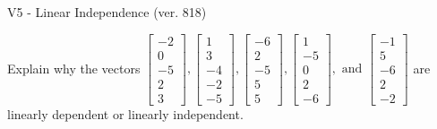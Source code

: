 \begin{exercise}
  \begin{exerciseTitle}V5 - Linear Independence (ver. 818)\end{exerciseTitle}
  \begin{exerciseStatement}
    Explain why the vectors \(\left[\begin{array}{r}
-2 \\
0 \\
-5 \\
2 \\
3
\end{array}\right] , \left[\begin{array}{r}
1 \\
3 \\
-4 \\
-2 \\
-5
\end{array}\right] , \left[\begin{array}{r}
-6 \\
2 \\
-5 \\
5 \\
5
\end{array}\right] , \left[\begin{array}{r}
1 \\
-5 \\
0 \\
2 \\
-6
\end{array}\right] , \text{ and } \left[\begin{array}{r}
-1 \\
5 \\
-6 \\
2 \\
-2
\end{array}\right]\) are linearly dependent or linearly independent.	



\end{exerciseStatement}
\end{exercise}
